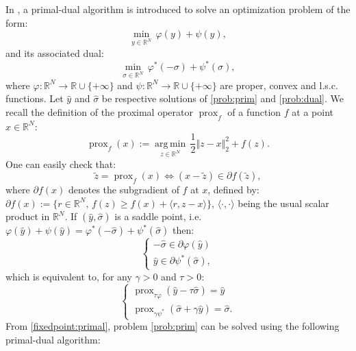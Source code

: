 \documentclass[conference]{IEEEtran}
\DeclareMathOperator*{\argmin}{arg\,min}
\DeclareMathOperator{\prox}{prox}
\begin{document}
In \cite{chambolle2011first}, a primal-dual algorithm is introduced to solve an optimization problem of the form:
\begin{equation}
\label{prob:prim}
\underset{y\in\mathbb{R}^N}{\min}\,\varphi (y) +\psi( y),
\end{equation}
and its associated dual:
\begin{equation}
\label{prob:dual}
\underset{\sigma\in\mathbb{R}^N}{\min}\,\varphi^\ast (-\sigma)
+\psi^\ast(\sigma),
\end{equation}
where
$\varphi:\mathbb{R}^N\to \mathbb{R}\cup \{+\infty \}$ and $\psi:\mathbb{R}^N\to \mathbb{R}\cup \{+\infty \}$ are proper, convex and l.s.c. functions.
Let $\hat{y}$ and  $\hat{\sigma}$ be respective solutions of \eqref{prob:prim} and \eqref{prob:dual}. 
We recall the definition of the proximal operator $\prox_f$ of a function $f$ at a point $x\in\mathbb{R}^N$:
\begin{equation}
\prox_{f}(x):=\underset{z\in\mathbb{R}^{N}}{\argmin}\,\frac{1}{2}\Vert z-x \Vert_2^2+f(z).
\end{equation}
One can easily check that:
\begin{equation}
\tilde{z}= \prox_{f}(x) \iff (x-\tilde{z})\in \partial f(\tilde{z}),
\end{equation}
where  $ \partial f(x)$ denotes the subgradient of $f$ at $x$, defined by: $\partial f(x):=\{r \in \mathbb{R}^N,\, f(z)\geq f(x)+ \langle r,z-x\rangle\}$, $\langle \cdot, \cdot \rangle$ being the usual scalar product in $\mathbb{R}^N$. If $(\hat{y},\hat{\sigma})$ is a saddle point, i.e. $\varphi (\hat{y}) +\psi( \hat{y})= \varphi^\ast (-\hat{\sigma})
+\psi^\ast(\hat{\sigma})$ then:
\begin{equation}
\left\{
\begin{array}{l}
-\hat{\sigma}\in\partial\varphi(\hat{y})\\
 \hat{y}\in\partial \psi^\ast(\hat{\sigma}),
\end{array}
\right.
\end{equation}
which is equivalent to, for any $\gamma>0$ and $\tau>0$:
\begin{equation}
\label{fixedpoint:primal}
\left\{
\begin{array}{l}
\prox_{\tau\varphi}(\hat{y}-\tau\hat{\sigma})=\hat{y}\\
\prox_{\gamma\psi^\ast}(\hat{\sigma}+\gamma\hat{y})=\hat{\sigma}.
\end{array}
\right.
\end{equation}
From \eqref{fixedpoint:primal}, problem \eqref{prob:prim} can be solved using the following primal-dual algorithm:
\end{document}
